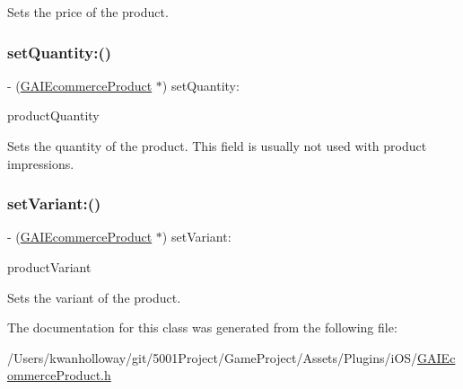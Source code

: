 Sets the price of the product. \mbox{\label{interface_g_a_i_ecommerce_product_aac80209c3d8c6567900f289583e272aa}} 
\subsubsection{\texorpdfstring{set\+Quantity\+:()}{setQuantity:()}}
{\footnotesize\ttfamily -\/ (\hyperlink{interface_g_a_i_ecommerce_product}{G\+A\+I\+Ecommerce\+Product} $\ast$) set\+Quantity\+: \begin{DoxyParamCaption}\item[{(N\+S\+Number $\ast$)}]{product\+Quantity }\end{DoxyParamCaption}}

Sets the quantity of the product. This field is usually not used with product impressions. \mbox{\label{interface_g_a_i_ecommerce_product_aeb93bbdcb44cf4f0fce479bc08abeea9}} 
\subsubsection{\texorpdfstring{set\+Variant\+:()}{setVariant:()}}
{\footnotesize\ttfamily -\/ (\hyperlink{interface_g_a_i_ecommerce_product}{G\+A\+I\+Ecommerce\+Product} $\ast$) set\+Variant\+: \begin{DoxyParamCaption}\item[{(N\+S\+String $\ast$)}]{product\+Variant }\end{DoxyParamCaption}}

Sets the variant of the product. 

The documentation for this class was generated from the following file\+:\begin{DoxyCompactItemize}
\item 
/\+Users/kwanholloway/git/5001\+Project/\+Game\+Project/\+Assets/\+Plugins/i\+O\+S/\hyperlink{_g_a_i_ecommerce_product_8h}{G\+A\+I\+Ecommerce\+Product.\+h}\end{DoxyCompactItemize}
